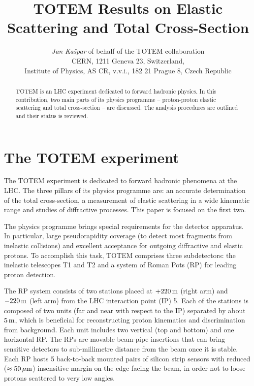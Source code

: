 \documentclass{desyproc}
\def\un#1{\,{\rm #1}}
\begin{document}
\title{TOTEM Results on Elastic Scattering and Total Cross-Section}

\author{{\slshape Jan Ka\v spar} of behalf of the TOTEM collaboration\\[1ex]
CERN, 1211 Geneva 23, Switzerland,\\
Institute of Physics, AS CR, v.v.i., 182 21 Prague 8, Czech Republic
}

 

\maketitle

\begin{abstract}
TOTEM is an LHC experiment dedicated to forward hadronic physics. In this contribution, two main parts of its physics programme -- proton-proton elastic scattering and total cross-section -- are discussed. The analysis procedures are outlined and their status is reviewed.
\end{abstract}

\section{The TOTEM experiment}

The TOTEM experiment \cite{totem_jinst} is dedicated to forward hadronic phenomena at the LHC. The three pillars of its physics programme are: an accurate determination of the total cross-section, a measurement of elastic scattering in a wide kinematic range and studies of diffractive processes. This paper is focused on the first two. 

The physics programme brings special requirements for the detector apparatus. In particular, large pseudorapidity coverage (to detect most fragments from inelastic collisions) and excellent acceptance for outgoing diffractive and elastic protons. To accomplish this task, TOTEM comprises three subdetectors: the inelastic telescopes T1 and T2 and a system of Roman Pots (RP) for leading proton detection.

The RP system consists of two stations placed at $+220\un{m}$ (right arm) and $-220\un{m}$ (left arm) from the LHC interaction point (IP) 5. Each of the stations is composed of two units (far and near with respect to the IP) separated by about $5\un{m}$, which is beneficial for reconstructing proton kinematics and discrimination from background. Each unit includes two vertical (top and bottom) and one horizontal RP. The RPs are movable beam-pipe insertions that can bring sensitive detectors to sub-millimetre distance from the beam once it is stable. Each RP hosts 5 back-to-back mounted pairs of silicon strip sensors with reduced ($\approx 50\un{\mu m}$) insensitive margin on the edge facing the beam, in order not to loose protons scattered to very low angles.
\end{document}
